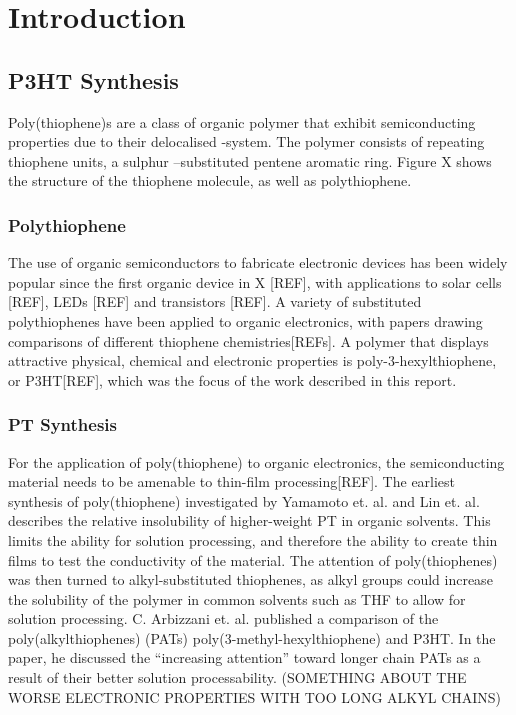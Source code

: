 \chapter{Introduction}

\section{P3HT Synthesis}
Poly(thiophene)s are a class of organic polymer that exhibit semiconducting properties due to their delocalised -system. The polymer consists of repeating thiophene units, a sulphur –substituted pentene aromatic ring. Figure X shows the structure of the thiophene molecule, as well as polythiophene. 

\subsection{Polythiophene}

The use of organic semiconductors to fabricate electronic devices has been widely popular since the first organic device in X [REF], with applications to solar cells [REF], LEDs [REF] and transistors [REF]. A variety of substituted polythiophenes have been applied to organic electronics, with papers drawing comparisons of different thiophene chemistries[REFs]. A polymer that displays attractive physical, chemical and electronic properties is poly-3-hexylthiophene, or P3HT[REF], which was the focus of the work described in this report. 

\subsection{PT Synthesis}

For the application of poly(thiophene) to organic electronics, the semiconducting material needs to be amenable to thin-film processing[REF]. The earliest synthesis of poly(thiophene) investigated by Yamamoto et. al. and Lin et. al. describes the relative insolubility of higher-weight PT in organic solvents. This limits the ability for solution processing, and therefore the ability to create thin films to test the conductivity of the material. The attention of poly(thiophenes) was then turned to alkyl-substituted thiophenes, as alkyl groups could increase the solubility of the polymer in common solvents such as THF to allow for solution processing.
C. Arbizzani et. al. published a comparison of the poly(alkylthiophenes) (PATs) poly(3-methyl-hexylthiophene) and P3HT. In the paper, he discussed the “increasing attention” toward longer chain PATs as a result of their better solution processability. (SOMETHING ABOUT THE WORSE ELECTRONIC PROPERTIES WITH TOO LONG ALKYL CHAINS)

